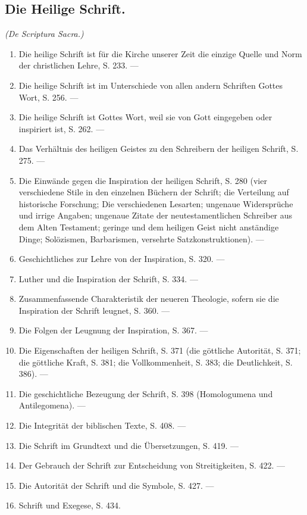 \subsection*{Die Heilige Schrift.}
\textit{(De Scriptura Sacra.)}
\begin{enumerate}
\item Die heilige Schrift ist für die Kirche unserer Zeit die einzige Quelle und Norm der christlichen Lehre, S. 233. —
\item Die heilige Schrift ist im Unterschiede von allen andern Schriften Gottes Wort, S. 256. —
\item Die heilige Schrift ist Gottes Wort, weil sie von Gott eingegeben oder inspiriert ist, S. 262. —
\item Das Verhältnis des heiligen Geistes zu den Schreibern der heiligen Schrift, S. 275. —
\item Die Einwände gegen die Inspiration der heiligen Schrift, S. 280 (vier verschiedene Stile in den einzelnen Büchern der Schrift; die Verteilung auf historische Forschung; Die verschiedenen Lesarten; ungenaue Widersprüche und irrige Angaben; ungenaue Zitate der neutestamentlichen Schreiber aus dem Alten Testament; geringe und dem heiligen Geist nicht anständige Dinge; Solözismen, Barbarismen, versehrte Satzkonstruktionen). —
\item Geschichtliches zur Lehre von der Inspiration, S. 320. —
\item Luther und die Inspiration der Schrift, S. 334. —
\item Zusammenfassende Charakteristik der neueren Theologie, sofern sie die Inspiration der Schrift leugnet, S. 360. —
\item Die Folgen der Leugnung der Inspiration, S. 367. —
\item Die Eigenschaften der heiligen Schrift, S. 371 (die göttliche Autorität, S. 371; die göttliche Kraft, S. 381; die Vollkommenheit, S. 383; die Deutlichkeit, S. 386). —
\item Die geschichtliche Bezeugung der Schrift, S. 398 (Homologumena und Antilegomena). —
\item Die Integrität der biblischen Texte, S. 408. —
\item Die Schrift im Grundtext und die Übersetzungen, S. 419. —
\item Der Gebrauch der Schrift zur Entscheidung von Streitigkeiten, S. 422. —
\item Die Autorität der Schrift und die Symbole, S. 427. —
\item Schrift und Exegese, S. 434.
\end{enumerate}